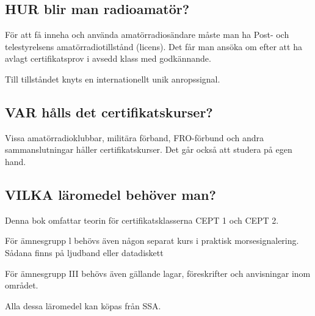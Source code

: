 \subsection*{HUR blir man radioamatör?}

\begin{rev-omarbetas}

För att få inneha och använda amatörradiosändare måste man ha Post- och telestyrelsens
amatörradiotillstånd (licens). Det får man ansöka om efter att ha avlagt certifikatsprov
i avsedd klass med godkännande.

Till tillståndet knyts en internationellt unik anropssignal.

\end{rev-omarbetas}

\subsection*{VAR hålls det certifikatskurser?}

Vissa amatörradioklubbar, militära förband,
FRO-förbund och andra sammanslutningar
håller certifikatskurser. Det går också att
studera på egen hand.

\subsection*{VILKA läromedel behöver man?}

\begin{rev-omarbetas}

Denna bok omfattar teorin för certifikatsklasserna CEPT 1 och CEPT 2.

För ämnesgrupp l behövs även någon separat kurs i praktisk morsesignalering.
Sådana finns på ljudband eller datadiskett

För ämnesgrupp III behövs även gällande lagar, föreskrifter och anvisningar inom
området.

Alla dessa läromedel kan köpas från SSA.

\end{rev-omarbetas}
